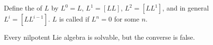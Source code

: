 Define the  of $L$ by $L^0 = L$, $L^1 = [LL]$, $L^2 = [L L^1]$, and in general $L^i = [L L^{i-1}]$. $L$ is called  if $L^n = 0$ for some $n$.

Every nilpotent Lie algebra is solvable, but the converse is false.

